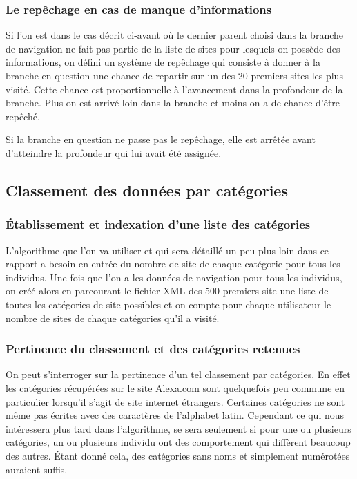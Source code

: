 \documentclass[a4paper, 11pt]{article}
\begin{document}
\subsubsection{Le repêchage en cas de manque d'informations}

Si l'on est dans le cas décrit ci-avant où le dernier parent choisi dans la branche de navigation ne fait pas partie de la liste de sites pour lesquels on possède des informations, on défini un système de repêchage qui consiste à donner à la branche en question une chance de repartir sur un des 20 premiers sites les plus visité. Cette chance est proportionnelle à l'avancement dans la profondeur de la branche. Plus on est arrivé loin dans la branche et moins on a de chance d'être repêché.

Si la branche en question ne passe pas le repêchage, elle est arrêtée avant d'atteindre la profondeur qui lui avait été assignée.

\subsection{Classement des données par catégories}

\subsubsection{Établissement et indexation d'une liste des catégories}

L'algorithme que l'on va utiliser et qui sera détaillé un peu plus loin dans ce rapport a besoin en entrée du nombre de site de chaque catégorie pour tous les individus. Une fois que l'on a les données de navigation pour tous les individus, on créé alors en parcourant le fichier XML des 500 premiers site une liste de toutes les catégories de site possibles et on compte pour chaque utilisateur le nombre de sites de chaque catégories qu'il a visité.

\subsubsection{Pertinence du classement et des catégories retenues}

On peut s'interroger sur la pertinence d'un tel classement par catégories. En effet les catégories récupérées sur le site \href{http://www.alexa.com/siteinfo}{Alexa.com} sont quelquefois peu commune en particulier lorsqu'il s'agit de site internet étrangers. Certaines catégories ne sont même pas écrites avec des caractères de l'alphabet latin. Cependant ce qui nous intéressera plus tard dans l'algorithme, se sera seulement si pour une ou plusieurs catégories, un ou plusieurs individu ont des comportement qui diffèrent beaucoup des autres. Étant donné cela, des catégories sans noms et simplement numérotées auraient suffis.
\end{document}
